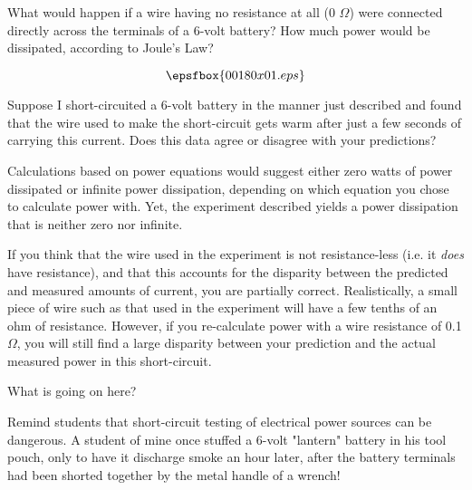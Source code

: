 

What would happen if a wire having no resistance at all (0 $\Omega$) were connected directly across the terminals of a 6-volt battery?  How much power would be dissipated, according to Joule's Law?  

$$\epsfbox{00180x01.eps}$$

Suppose I short-circuited a 6-volt battery in the manner just described and found that the wire used to make the short-circuit gets warm after just a few seconds of carrying this current.  Does this data agree or disagree with your predictions?







Calculations based on power equations would suggest either zero watts of power dissipated or infinite power dissipation, depending on which equation you chose to calculate power with.  Yet, the experiment described yields a power dissipation that is neither zero nor infinite.

If you think that the wire used in the experiment is not resistance-less (i.e. it {\it does} have resistance), and that this accounts for the disparity between the predicted and measured amounts of current, you are partially correct.  Realistically, a small piece of wire such as that used in the experiment will have a few tenths of an ohm of resistance.  However, if you re-calculate power with a wire resistance of 0.1 $\Omega$, you will still find a large disparity between your prediction and the actual measured power in this short-circuit.

What is going on here?







Remind students that short-circuit testing of electrical power sources can be dangerous.  A student of mine once stuffed a 6-volt "lantern" battery in his tool pouch, only to have it discharge smoke an hour later, after the battery terminals had been shorted together by the metal handle of a wrench!




